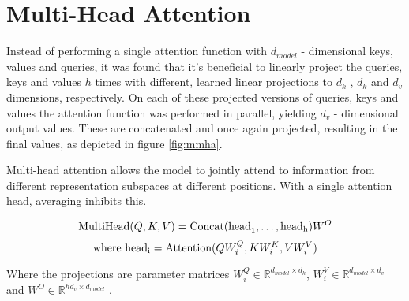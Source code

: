 \section*{Multi-Head Attention}
\label{sec:mlthdatn}

\hspace{0.5cm} Instead of performing a single attention function with $d_{model}$ - dimensional keys, values and queries, it was found that it's beneficial to linearly project the queries, keys and values $h$ times with different, learned linear projections to $d_k$ , $d_k$ and $d_v$ dimensions, respectively. On each of these projected versions of queries, keys and values the attention function was performed in parallel, yielding $d_v$ - dimensional output values. These are concatenated and once again projected, resulting in the final values, as depicted in figure \eqref{fig:mmha}.

Multi-head attention allows the model to jointly attend to information from different representation
subspaces at different positions. With a single attention head, averaging inhibits this.

\[\textnormal{MultiHead}(Q, K, V) = \textnormal{Concat(head}_1, \hdots, \textnormal{head}_\textnormal{h})W^O \]
\[\textnormal{where head}_\textnormal{i} = \textnormal{Attention}(QW_i^Q, KW_i^K, VW_i^V)\]

Where the projections are parameter matrices $W_i^Q \in \mathbb{R}^{d_{model}\times d_k}$, $W_i^V \in \mathbb{R}^{d_{model}\times d_v}$ and $W^O \in \mathbb{R}^{hd_v\times d_{model}}$ \cite{2017arXiv170603762V}.

\vspace*{\fill}